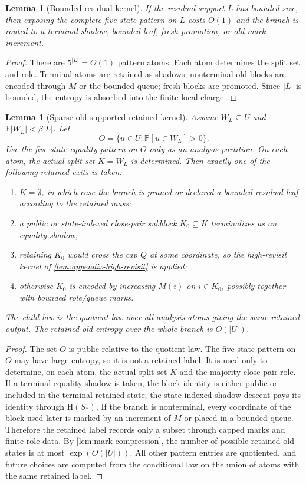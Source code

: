 \documentclass[11pt]{article}
\newcommand{\Cref}[1]{\ref{#1}}
\newtheorem{lemma}[theorem]{Lemma}
\theoremstyle{remark}
\newcommand{\E}{\mathbb E}
\newcommand{\Prob}{\mathbb P}
\newcommand{\HH}{\mathrm H}
\begin{document}
\begin{lemma}[Bounded residual kernel]\label{lem:appendix-bounded-residual}
If the residual support $L$ has bounded size, then exposing the complete five-state pattern on $L$ costs $O(1)$ and the branch is routed to a terminal shadow, bounded leaf, fresh promotion, or old mark increment.
\end{lemma}

\begin{proof}
There are $5^{|L|}=O(1)$ pattern atoms.  Each atom determines the split set and role.  Terminal atoms are retained as shadows; nonterminal old blocks are encoded through $M$ or the bounded queue; fresh blocks are promoted.  Since $|L|$ is bounded, the entropy is absorbed into the finite local charge.
\end{proof}

\begin{lemma}[Sparse old-supported retained kernel]\label{lem:appendix-sparse-old}
Assume $W_L\subseteq U$ and $\E|W_L|<\beta|L|$.  Let
\[
        O=\{u\in U:\Prob[u\in W_L]>0\}.
\]
Use the five-state equality pattern on $O$ only as an analysis partition.  On each atom, the actual split set $K=W_L$ is determined.  Then exactly one of the following retained exits is taken:
\begin{enumerate}[label=\textup{(\alph*)}]
\item $K=\emptyset$, in which case the branch is pruned or declared a bounded residual leaf according to the retained mass;
\item a public or state-indexed close-pair subblock $K_0\subseteq K$ terminalizes as an equality shadow;
\item retaining $K_0$ would cross the cap $Q$ at some coordinate, so the high-revisit kernel of \Cref{lem:appendix-high-revisit} is applied;
\item otherwise $K_0$ is encoded by increasing $M(i)$ on $i\in K_0$, possibly together with bounded role/queue marks.
\end{enumerate}
The child law is the quotient law over all analysis atoms giving the same retained output.  The retained old entropy over the whole branch is $O(|U|)$.
\end{lemma}

\begin{proof}
The set $O$ is public relative to the quotient law.  The five-state pattern on $O$ may have large entropy, so it is not a retained label.  It is used only to determine, on each atom, the actual split set $K$ and the majority close-pair role.  If a terminal equality shadow is taken, the block identity is either public or included in the terminal retained state; the state-indexed shadow descent pays its identity through $\HH(S_*)$.  If the branch is nonterminal, every coordinate of the block used later is marked by an increment of $M$ or placed in a bounded queue.  Therefore the retained label records only a subset through capped marks and finite role data.  By \Cref{lem:mark-compression}, the number of possible retained old states is at most $\exp(O(|U|))$.  All other pattern entries are quotiented, and future choices are computed from the conditional law on the union of atoms with the same retained label.
\end{proof}
\end{document}
